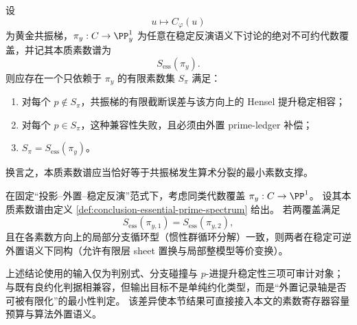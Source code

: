 \begin{conjecture}[共振梯与本质素数谱的耦合]\label{conj:conclusion-resonance-ladder-essential-prime-spectrum-coupling}
设
\[
u\longmapsto C_\varphi(u)
\]
为黄金共振梯，\(\pi_y:C\to\PP^1_y\) 为任意在稳定反演语义下讨论的绝对不可约代数覆盖，并记其本质素数谱为
\[
S_{\mathrm{ess}}(\pi_y).
\]
则应存在一个只依赖于 \(\pi_y\) 的有限素数集 \(S_\pi\) 满足：
\begin{enumerate}
  \item 对每个 \(p\notin S_\pi\)，共振梯的有限截断误差与该方向上的 Hensel 提升稳定相容；
  \item 对每个 \(p\in S_\pi\)，这种兼容性失败，且必须由外置 prime-ledger 补偿；
  \item \(S_\pi=S_{\mathrm{ess}}(\pi_y)\)。
\end{enumerate}
换言之，本质素数谱应当恰好等于共振梯发生算术分裂的最小素数支撑。
\end{conjecture}

\begin{conjecture}[本质素数谱与局部分支循环型的完备性]\label{conj:conclusion-essential-spectrum-completeness}
在固定“投影--外置--稳定反演”范式下，考虑同类代数覆盖
\(
\pi_y:C\to\PP^1
\)。
设其本质素数谱由定义 \ref{def:conclusion-essential-prime-spectrum} 给出。
若两覆盖满足
\[
S_{\mathrm{ess}}(\pi_{y,1})=S_{\mathrm{ess}}(\pi_{y,2}),
\]
且在各素数方向上的局部分支循环型（惯性群循环分解）一致，则两者在稳定可逆外置语义下同构（允许有限层 sheet 置换与局部整模型等价变换）。
\end{conjecture}

\begin{remark}[与判别式判据的接口定位]\label{rem:conclusion-essential-prime-spectrum-interface}
上述结论使用的输入仅为判别式、分支碰撞与 \(p\)-进提升稳定性三项可审计对象；与既有良约化判据相兼容，但输出目标不是单纯约化类型，而是“外置记录轴是否可被有限化”的最小性判定。
该差异使本节结果可直接接入本文的素数寄存器容量预算与算法外置语义。
\end{remark}
